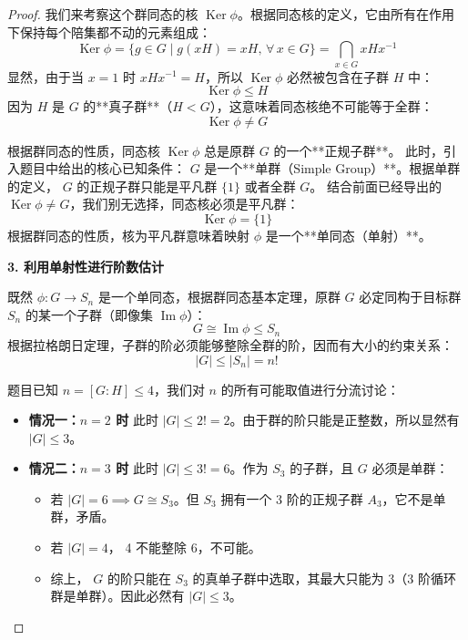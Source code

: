\documentclass[]{article}
\begin{document}
\begin{proof}
我们来考察这个群同态的核 $\operatorname{Ker}\phi$。根据同态核的定义，它由所有在作用下保持每个陪集都不动的元素组成：
\[ \operatorname{Ker}\phi = \{ g \in G \mid g(xH) = xH, \, \forall \, x \in G \} = \bigcap_{x \in G} xHx^{-1} \]
显然，由于当 $x=1$ 时 $xHx^{-1} = H$，所以 $\operatorname{Ker}\phi$ 必然被包含在子群 $H$ 中：
\[ \operatorname{Ker}\phi \leqslant H \]
因为 $H$ 是 $G$ 的**真子群**（$H < G$），这意味着同态核绝不可能等于全群：
\[ \operatorname{Ker}\phi \neq G \]

根据群同态的性质，同态核 $\operatorname{Ker}\phi$ 总是原群 $G$ 的一个**正规子群**。
此时，引入题目中给出的核心已知条件： $G$ 是一个**单群（Simple Group）**。根据单群的定义， $G$ 的正规子群只能是平凡群 $\{1\}$ 或者全群 $G$。
结合前面已经导出的 $\operatorname{Ker}\phi \neq G$，我们别无选择，同态核必须是平凡群：
\[ \operatorname{Ker}\phi = \{1\} \]
根据群同态的性质，核为平凡群意味着映射 $\phi$ 是一个**单同态（单射）**。

\bigskip
\noindent \textbf{3. 利用单射性进行阶数估计}

既然 $\phi: G \to S_n$ 是一个单同态，根据群同态基本定理，原群 $G$ 必定同构于目标群 $S_n$ 的某一个子群（即像集 $\operatorname{Im}\phi$）：
\[ G \cong \operatorname{Im}\phi \leqslant S_n \]
根据拉格朗日定理，子群的阶必须能够整除全群的阶，因而有大小的约束关系：
\[ |G| \leqslant |S_n| = n! \]

题目已知 $n = [G:H] \leqslant 4$，我们对 $n$ 的所有可能取值进行分流讨论：

\begin{itemize}
	\item \textbf{情况一：$n = 2$ 时}
	此时 $|G| \leqslant 2! = 2$。由于群的阶只能是正整数，所以显然有 $|G| \leqslant 3$。
	
	\item \textbf{情况二：$n = 3$ 时}
	此时 $|G| \leqslant 3! = 6$。作为 $S_3$ 的子群，且 $G$ 必须是单群：
	\begin{itemize}
		\item 若 $|G| = 6 \implies G \cong S_3$。但 $S_3$ 拥有一个 3 阶的正规子群 $A_3$，它不是单群，矛盾。
		\item 若 $|G| = 4$， 4 不能整除 6，不可能。
		\item 综上， $G$ 的阶只能在 $S_3$ 的真单子群中选取，其最大只能为 3（3 阶循环群是单群）。因此必然有 $|G| \leqslant 3$。
	\end{itemize}
	

\end{itemize}
\end{proof}
\end{document}
